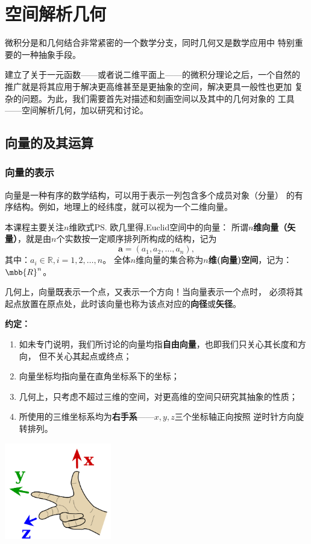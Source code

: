\setcounter{chapter}{7}

\chapter{空间解析几何}

微积分是和几何结合非常紧密的一个数学分支，同时几何又是数学应用中
特别重要的一种抽象手段。

建立了关于一元函数——或者说二维平面上——的微积分理论之后，一个自然的
推广就是将其应用于解决更高维甚至是更抽象的空间，解决更具一般性也更加
复杂的问题。为此，我们需要首先对描述和刻画空间以及其中的几何对象的
工具——空间解析几何，加以研究和讨论。

\section{向量的及其运算}

\subsection{向量的表示}

向量是一种有序的数学结构，可以用于表示一列包含多个成员对象（分量）
的有序结构。例如，地理上的经纬度，就可以视为一个二维向量。

本课程主要关注{\kaishu $n$维欧式\ps{欧几里得,Euclid}空间}中的向量：
所谓{\bf $n$维向量（矢量）}，就是由$n$个实数按一定顺序排列所构成的结构，记为
$$\bm{a}=(a_1,a_2,\ldots,a_n),$$
其中：$a_i\in\mathbb{R},i=1,2,\ldots,n$。
全体$n$维向量的集合称为{\bf $n$维(向量)空间}，记为：$\mbb{R}^n$。

几何上，向量既表示一个点，又表示一个方向！{\kaishu 当向量表示一个点时，
必须将其起点放置在原点处，此时该向量也称为该点对应的{\bf 向径}或{\bf 矢径}}。

\begin{thx}
	{\bf 约定：}
	\begin{enumerate}
	  \item 如未专门说明，我们所讨论的向量均指{\bf 自由向量}，也即我们只关心其长度和方向，
	  但不关心其起点或终点；
	  \item 向量坐标均指向量在直角坐标系下的坐标；
	  \item 几何上，只考虑不超过三维的空间，对更高维的空间只研究其抽象的性质；
	  \item 所使用的三维坐标系均为{\bf 右手系}——$x,y,z$三个坐标轴正向按照
	  逆时针方向旋转排列。	  
	\end{enumerate}
	\begin{center}
		\includegraphics[width=0.35\textwidth]{./images/ch8/Right_hand_rule_Cartesian_axes.png}
	\end{center}
\end{thx}

